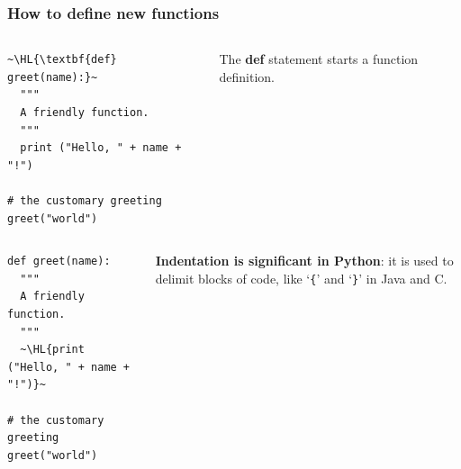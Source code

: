 \documentclass[english,serif,mathserif,xcolor=pdftex,dvipsnames,table]{beamer}
\begin{document}




\begin{frame}[fragile]
  \frametitle{How to define new functions}
  \begin{columns}[t]
    \begin{column}{0.5\textwidth}
\begin{lstlisting}
~\HL{\textbf{def} greet(name):}~
  """
  A friendly function.
  """
  print ("Hello, " + name + "!")

# the customary greeting
greet("world")
\end{lstlisting}
    \end{column}
    \begin{column}{0.5\textwidth}
      \raggedleft
      The \textbf{def} statement starts a function definition.
    \end{column}
  \end{columns}
\end{frame}

\begin{frame}[fragile]
  \begin{columns}[t]
    \begin{column}{0.5\textwidth}
\begin{lstlisting}
def greet(name):
  """
  A friendly function.
  """
  ~\HL{print ("Hello, " + name + "!")}~

# the customary greeting
greet("world")
\end{lstlisting}
    \end{column}
    \begin{column}{0.5\textwidth}
      \raggedleft
      \textbf{Indentation is significant in Python}: it is used to delimit
      blocks of code, like `\texttt{\{}' and `\texttt{\}}' in Java and C.
    \end{column}
  \end{columns}
\end{frame}
\end{document}
